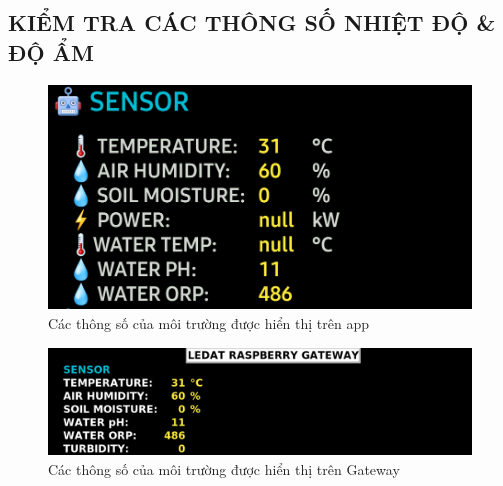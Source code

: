 \subsection{KIỂM TRA CÁC THÔNG SỐ NHIỆT ĐỘ \& ĐỘ ẨM}
\begin{figure}[H]
	\centering
	\includegraphics[scale=0.4]{Chapter 4/image chapter 4/appMT.png}
	\caption[Các thông số của môi trường được hiển thị trên app]{Các thông số của môi trường được hiển thị trên app}
	\label{hinh43}
\end{figure}
\begin{figure}[H]
	\centering
	\includegraphics[scale=0.4]{Chapter 4/image chapter 4/gwMT.png}
	\caption[Các thông số của môi trường được hiển thị trên Gateway]{Các thông số của môi trường được hiển thị trên Gateway}
	\label{hinh44}
\end{figure}
